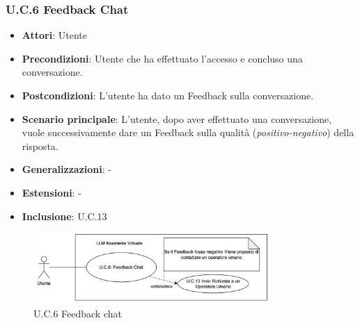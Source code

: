 \subsubsection{U.C.6 Feedback Chat}
\begin{itemize}
    \item \textbf{Attori}: Utente
    \item \textbf{Precondizioni}: Utente che ha effettuato l'accesso e concluso una conversazione.
    \item \textbf{Postcondizioni}: L'utente ha dato un Feedback sulla conversazione.
    \item \textbf{Scenario principale}: L'utente, dopo aver effettuato una conversazione, vuole successivamente dare un Feedback sulla qualità (\textit{positivo-negativo}) della risposta.
    \item \textbf{Generalizzazioni}: -
    \item \textbf{Estensioni}: -
    \item \textbf{Inclusione}: U.C.13
\end{itemize}
\begin{figure}[h!]
    \centering
    \includegraphics[width=0.8\textwidth]{img/UC6.png}
    \caption{U.C.6 Feedback chat}
\end{figure}
